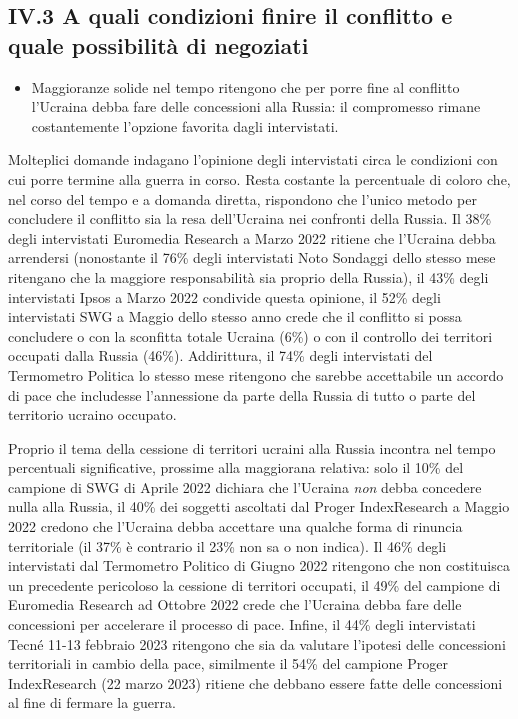 \documentclass[
  openany]{book}
\providecommand{\tightlist}{%
  \setlength{\itemsep}{0pt}\setlength{\parskip}{0pt}}
\begin{document}
\hypertarget{iv.3-a-quali-condizioni-finire-il-conflitto-e-quale-possibilituxe0-di-negoziati}{%
\subsection{IV.3 A quali condizioni finire il conflitto e quale possibilità di negoziati}\label{iv.3-a-quali-condizioni-finire-il-conflitto-e-quale-possibilituxe0-di-negoziati}}

\begin{itemize}
\tightlist
\item
  Maggioranze solide nel tempo ritengono che per porre fine al conflitto l'Ucraina debba fare delle concessioni alla Russia: il compromesso rimane costantemente l'opzione favorita dagli intervistati.
\end{itemize}

Molteplici domande indagano l'opinione degli intervistati circa le condizioni con cui porre termine alla guerra in corso. Resta costante la percentuale di coloro che, nel corso del tempo e a domanda diretta, rispondono che l'unico metodo per concludere il conflitto sia la resa dell'Ucraina nei confronti della Russia. Il 38\% degli intervistati Euromedia Research a Marzo 2022 ritiene che l'Ucraina debba arrendersi (nonostante il 76\% degli intervistati Noto Sondaggi dello stesso mese ritengano che la maggiore responsabilità sia proprio della Russia), il 43\% degli intervistati Ipsos a Marzo 2022 condivide questa opinione, il 52\% degli intervistati SWG a Maggio dello stesso anno crede che il conflitto si possa concludere o con la sconfitta totale Ucraina (6\%) o con il controllo dei territori occupati dalla Russia (46\%). Addirittura, il 74\% degli intervistati del Termometro Politica lo stesso mese ritengono che sarebbe accettabile un accordo di pace che includesse l'annessione da parte della Russia di tutto o parte del territorio ucraino occupato.

Proprio il tema della cessione di territori ucraini alla Russia incontra nel tempo percentuali significative, prossime alla maggiorana relativa: solo il 10\% del campione di SWG di Aprile 2022 dichiara che l'Ucraina \emph{non} debba concedere nulla alla Russia, il 40\% dei soggetti ascoltati dal Proger IndexResearch a Maggio 2022 credono che l'Ucraina debba accettare una qualche forma di rinuncia territoriale (il 37\% è contrario il 23\% non sa o non indica). Il 46\% degli intervistati dal Termometro Politico di Giugno 2022 ritengono che non costituisca un precedente pericoloso la cessione di territori occupati, il 49\% del campione di Euromedia Research ad Ottobre 2022 crede che l'Ucraina debba fare delle concessioni per accelerare il processo di pace. Infine, il 44\% degli intervistati Tecné 11-13 febbraio 2023 ritengono che sia da valutare l'ipotesi delle concessioni territoriali in cambio della pace, similmente il 54\% del campione Proger IndexResearch (22 marzo 2023) ritiene che debbano essere fatte delle concessioni al fine di fermare la guerra.
\end{document}
